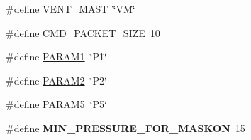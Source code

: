 \begin{DoxyCompactItemize}
\item 
\#define \hyperlink{group___state_control_module_gaab73182824268aecb152070ffff886c5}{V\+E\+N\+T\+\_\+\+M\+A\+ST}~\char`\"{}VM\char`\"{}
\item 
\#define \hyperlink{group___state_control_module_ga79dc44f60cd39aecaa81ba77d440848b}{C\+M\+D\+\_\+\+P\+A\+C\+K\+E\+T\+\_\+\+S\+I\+ZE}~10
\item 
\#define \hyperlink{group___state_control_module_ga7592aa1eaa790ae27e542130b3864191}{P\+A\+R\+A\+M1}~\char`\"{}P1\char`\"{}
\item 
\#define \hyperlink{group___state_control_module_gabdd1bc0c9e1b837bbf643458c90e44c4}{P\+A\+R\+A\+M2}~\char`\"{}P2\char`\"{}
\item 
\#define \hyperlink{group___state_control_module_ga5febf7030347536205e990838c8731cf}{P\+A\+R\+A\+M5}~\char`\"{}P5\char`\"{}
\item 
\mbox{\label{group___state_control_module_ga33e206a1904f0a924147d11852d1977b}} 
\#define {\bfseries M\+I\+N\+\_\+\+P\+R\+E\+S\+S\+U\+R\+E\+\_\+\+F\+O\+R\+\_\+\+M\+A\+S\+K\+ON}~15
\end{DoxyCompactItemize}
